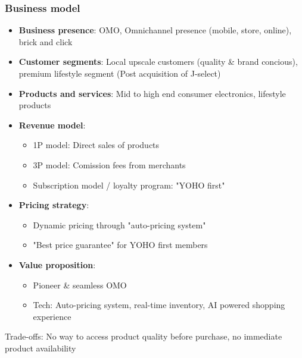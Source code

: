 \subsubsection{Business model}
\begin{itemize}
    \item \textbf{Business presence}: OMO, Omnichannel presence (mobile, store, online), brick and click
    \item \textbf{Customer segments}: Local upscale customers (quality \& brand concious), premium lifestyle segment (Post acquisition of J-select)
    \item \textbf{Products and services}: Mid to high end consumer electronics, lifestyle products
    \item \textbf{Revenue model}:
          \begin{itemize}
              \item 1P model: Direct sales of products
              \item 3P model: Comission fees from merchants
              \item Subscription model / loyalty program: "YOHO first"
          \end{itemize}
    \item \textbf{Pricing strategy}:
          \begin{itemize}
              \item Dynamic pricing through "auto-pricing system"
              \item "Best price guarantee" for YOHO first members
          \end{itemize}
    \item \textbf{Value proposition}:
          \begin{itemize}
              \item Pioneer \& seamless OMO
              \item Tech: Auto-pricing system, real-time inventory, AI powered shopping experience
          \end{itemize}
\end{itemize}

Trade-offs: No way to access product quality before purchase, no immediate product availability

